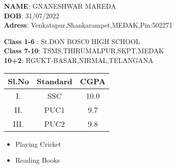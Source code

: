 \documentclass{beamer}
\title{\color{violet}{My First \LaTeX{} Presentation}}
\author{\textbf{NAME: GNANESHWAR MAREDA}}
\date{\today}
\begin{document}
\begin{frame}
\titlepage
\end{frame}

\begin{frame}
\Large{\textbf{NAME}: GNANESHWAR MAREDA}\\
\Large{\textbf{DOB}: 31/07/2022}\\
\Large{\textbf{Adress}: Venkatapur,Shankarampet,MEDAK,Pin:502271}\\
\end{frame}

\begin{frame}
\Large{\textbf{Class 1-6} : St.DON BOSC0 HIGH SCHOOL }
\\
\large{\textbf{Class 7-10}:   TSMS,THIRUMALPUR,SKPT,MEDAK }\\

\large{\textbf{10+2}:       RGUKT-BASAR,NIRMAL,TELANGANA}\\
\end{frame}

\begin{frame}
\begin{table}[h]
\centering
\begin{tabular}{|c|c|c|}
\hline
\textbf{Sl.No} & \textbf{Standard}& \textbf{CGPA}\\
\hline
I. & SSC & 10.0\\
\hline 
II. & PUC1 & 9.7\\
\hline
III. & PUC2 & 9.8\\
\hline
\end{tabular}
\end{table}
\end{frame}

\begin{frame}
\begin{itemize}
  \item Playing Cricket
  \item Reading Books 
\end{itemize}   
\end{frame}
\end{document}
